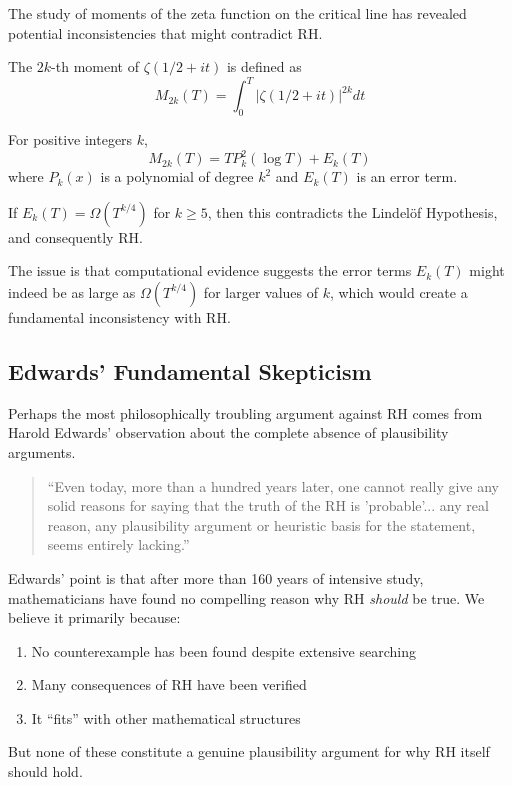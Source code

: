 The study of moments of the zeta function on the critical line has revealed potential inconsistencies that might contradict RH.

\begin{definition}
The $2k$-th moment of $\zeta(1/2 + it)$ is defined as
\begin{equation}
M_{2k}(T) = \int_0^T |\zeta(1/2 + it)|^{2k} dt
\end{equation}
\end{definition}

\begin{conjecture}
For positive integers $k$,
\begin{equation}
M_{2k}(T) = T P_k^2(\log T) + E_k(T)
\end{equation}
where $P_k(x)$ is a polynomial of degree $k^2$ and $E_k(T)$ is an error term.
\end{conjecture}

\begin{theorem}
If $E_k(T) = \Omega(T^{k/4})$ for $k \geq 5$, then this contradicts the Lindelöf Hypothesis, and consequently RH.
\end{theorem}

The issue is that computational evidence suggests the error terms $E_k(T)$ might indeed be as large as $\Omega(T^{k/4})$ for larger values of $k$, which would create a fundamental inconsistency with RH.

\subsection{Edwards' Fundamental Skepticism}
\label{subsec:edwards_skepticism}

Perhaps the most philosophically troubling argument against RH comes from Harold Edwards' observation about the complete absence of plausibility arguments.

\begin{quote}
``Even today, more than a hundred years later, one cannot really give any solid reasons for saying that the truth of the RH is 'probable'... any real reason, any plausibility argument or heuristic basis for the statement, seems entirely lacking.'' \cite{edwards1974}
\end{quote}

\begin{remark}
Edwards' point is that after more than 160 years of intensive study, mathematicians have found no compelling reason why RH \emph{should} be true. We believe it primarily because:
\begin{enumerate}
\item No counterexample has been found despite extensive searching
\item Many consequences of RH have been verified
\item It ``fits'' with other mathematical structures
\end{enumerate}
But none of these constitute a genuine plausibility argument for why RH itself should hold.
\end{remark}


